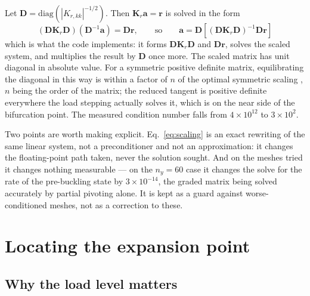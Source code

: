 \documentclass[11pt,a4paper]{article}
\begin{document}
Let $\boldsymbol{D} = \mathrm{diag}\left(|K_{r,kk}|^{-1/2}\right)$.  Then
$\boldsymbol{K}_r\boldsymbol{a} = \boldsymbol{r}$ is solved in the form
\begin{equation}\label{eq:scaling}
	\left(\boldsymbol{D}\boldsymbol{K}_r\boldsymbol{D}\right)
	\left(\boldsymbol{D}^{-1}\boldsymbol{a}\right)
	= \boldsymbol{D}\boldsymbol{r},
	\qquad\text{so}\qquad
	\boldsymbol{a} = \boldsymbol{D}\left[
	\left(\boldsymbol{D}\boldsymbol{K}_r\boldsymbol{D}\right)^{-1}
	\boldsymbol{D}\boldsymbol{r}\right]
\end{equation}
which is what the code implements: it forms
$\boldsymbol{D}\boldsymbol{K}_r\boldsymbol{D}$ and
$\boldsymbol{D}\boldsymbol{r}$, solves the scaled system, and multiplies the
result by $\boldsymbol{D}$ once more.  The scaled matrix has unit diagonal in
absolute value.  For a symmetric positive definite matrix, equilibrating the
diagonal in this way is within a factor of $n$ of the optimal symmetric
scaling \citep{vandersluis1969}, $n$ being the order of the matrix; the
reduced tangent is positive definite everywhere the load stepping actually
solves it, which is on the near side of the bifurcation point.  The measured
condition number falls from $4\times10^{12}$ to $3\times10^{2}$.

Two points are worth making explicit.  Eq.~\ref{eq:scaling} is an exact
rewriting of the same linear system, not a preconditioner and not an
approximation: it changes the floating-point path taken, never the solution
sought.  And on the meshes tried it changes nothing measurable --- on the
$n_y = 60$ case it changes the solve for the rate of the pre-buckling state by
$3\times10^{-14}$, the graded matrix being solved accurately by partial
pivoting alone.  It is kept as a guard
against worse-conditioned meshes, not as a correction to these.

\section{Locating the expansion point}
\label{sec:expansion-point}

\subsection{Why the load level matters}
\end{document}
